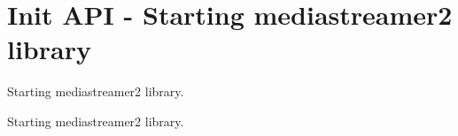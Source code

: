 \section{Init A\+PI -\/ Starting mediastreamer2 library}
\label{group__mediastreamer2__init}


Starting mediastreamer2 library.  


Starting mediastreamer2 library. 

